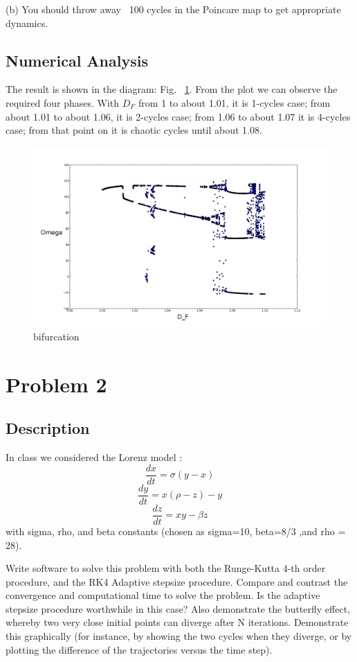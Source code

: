 \documentclass[11pt,letterpaper]{article}
\begin{document}
(b) You should throw away ~100 cycles in the Poincare map to get appropriate dynamics. 

\subsection{Numerical Analysis}

The result is shown in the diagram: Fig. ~\ref{figure1}.
From the plot we can observe the required four phases. With $D_F$ from 1 to about 1.01, it is 1-cycles case; from about 1.01 to about 1.06, it is 2-cycles case; from 1.06 to about 1.07 it is 4-cycles case; from that point on it is chaotic cycles until about 1.08.

\begin{figure}
\begin{center}
\includegraphics[width=0.8\linewidth,angle=0]{pendulum.png}
\caption{bifurcation}
\label{figure1}
\end{center}
\end{figure}




\newpage

\section{Problem 2}

\subsection{Description}
 In class we considered the Lorenz model : 
 $$
 \frac{dx}{dt}=\sigma(y-x)
 $$
 $$
 \frac{dy}{dt}=x(\rho-z)-y
$$
$$ 
 \frac{dz}{dt}=xy-\beta{z}
$$
 with sigma, rho, and beta constants (chosen as sigma=10, beta=8/3 ,and rho = 28). 

Write software to solve this problem with both the Runge-Kutta 4-th order procedure,  and the RK4 Adaptive stepsize procedure. Compare and contrast the convergence and computational time to solve the problem. Is the adaptive stepsize procedure worthwhile in this case? Also demonstrate the butterfly effect, whereby two very close initial points can diverge after N iterations. Demonstrate this graphically (for instance, by showing the two cycles when they diverge, or by plotting the difference of the trajectories versus the time step). 
\end{document}
